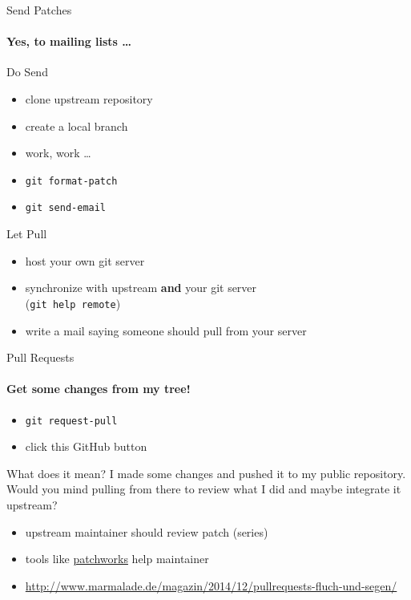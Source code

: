 \documentclass{beamer}
\makeatletter
\newcommand{\strong}[1]{\@strong{#1}}
\newcommand{\@@strong}[1]{\textbf{\let\@strong\@@@strong#1}}
\newcommand{\@@@strong}[1]{\textnormal{\let\@strong\@@strong#1}}
\let\@strong\@@strong
\makeatother
\begin{document}
\begin{frame}{Send Patches}
    \framesubtitle{Yes, to mailing lists \dots}
    \begin{block}{Do Send}
        \begin{itemize}
            \item clone upstream repository
            \item create a local branch
            \item work, work \dots
            \item \texttt{git format-patch}
            \item \texttt{git send-email}
        \end{itemize}
    \end{block}
    \pause
    \begin{block}{Let Pull}
        \begin{itemize}
            \item host your own git server
            \item synchronize with upstream \strong{and} your git server \\
                    (\texttt{git help remote})
            \item write a mail saying someone should pull from your server
        \end{itemize}
    \end{block}
\end{frame}

\begin{frame}{Pull Requests}
    \framesubtitle{Get some changes from my tree!}
    \begin{itemize}
        \item \texttt{git request-pull}
        \item click this GitHub button
    \end{itemize}
    \pause
    \begin{block}{What does it mean?}
        I made some changes and pushed it to my public repository.
        Would you mind pulling from there to review what I did and
        maybe integrate it upstream?
    \end{block}
    \pause
    \begin{itemize}
        \item upstream maintainer should review patch (series)
        \item tools like \href{https://patchwork.ozlabs.org/}{patchworks}
                help maintainer
        \item \url{http://www.marmalade.de/magazin/2014/12/pullrequests-fluch-und-segen/}
    \end{itemize}
\end{frame}
\end{document}
